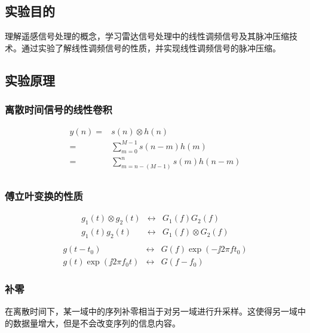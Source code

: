 \subsection{实验目的}
理解遥感信号处理的概念，学习雷达信号处理中的线性调频信号及其脉冲压缩技术。通过实验了解线性调频信号的性质，并实现线性调频信号的脉冲压缩。
\subsection{实验原理}
\subsubsection{离散时间信号的线性卷积}

\begin{equation}
\begin{split}
y(n) =& s(n) \otimes h(n) \\
=& \sum_{m=0}^{M-1} s(n - m)h(m) \\
=& \sum_{m=n-(M-1)}^{n} s(m)h(n - m) \\
\end{split}
\end{equation}
\subsubsection{傅立叶变换的性质}
\begin{eqnarray}
g_1(t)\otimes g_2(t) &\leftrightarrow& G_1(f)G_2(f) \\
g_1(t)g_2(t) &\leftrightarrow& G_1(f)\otimes G_2(f) \\
\end{eqnarray}
\begin{eqnarray}
g(t - t_0) &\leftrightarrow& G(f)\exp(-\jj 2\pi ft_0) \\
g(t)\exp(\jj 2\pi f_0t) &\leftrightarrow& G(f-f_0)
\end{eqnarray}
\subsubsection{补零}
在离散时间下，某一域中的序列补零相当于对另一域进行升采样。这使得另一域中的数据量增大，但是不会改变序列的信息内容。
